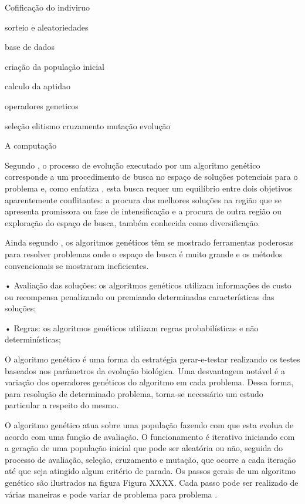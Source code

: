 


Cofificação do indiviruo 

sorteio e aleatoriedades

base de dados

criação da população inicial

calculo da aptidao

operadores geneticos

seleção 
elitismo 
cruzamento
mutação
evolução



A computação 





Segundo \cite{oliveira2005algoritmo}, o processo de evolução executado por um algoritmo genético corresponde a um procedimento de busca no espaço de soluções potenciais para o problema e, como enfatiza \cite{michalewicz1996evolutionary}, esta busca requer um equilíbrio entre dois objetivos aparentemente conflitantes: a procura das melhores soluções na região que se apresenta promissora ou fase de intensificação e a procura de outra região ou exploração do espaço de busca, também conhecida como diversificação.\par

Ainda segundo \cite{oliveira2005algoritmo}, os algoritmos genéticos têm se mostrado ferramentas poderosas para resolver problemas onde o espaço de busca é muito grande e os métodos convencionais se mostraram ineficientes.\par


•  Avaliação das soluções: os algoritmos genéticos utilizam informações de custo ou recompensa penalizando ou premiando determinadas características das soluções; \par

•  Regras: os algoritmos genéticos utilizam regras probabilísticas e não determinísticas; \par

O algoritmo genético é uma forma da estratégia gerar-e-testar realizando os testes baseados nos parâmetros da evolução biológica. Uma desvantagem notável é a variação dos operadores genéticos do algoritmo em cada problema. Dessa forma, para resolução de determinado problema, torna-se necessário um estudo particular a respeito do mesmo. \par

O algoritmo genético atua sobre uma população fazendo com que esta evolua de acordo com uma função de avaliação. O funcionamento é iterativo iniciando com a geração de uma população inicial que pode ser aleatória ou não, seguida do processo de avaliação, seleção, cruzamento e mutação, que ocorre a cada iteração até que seja atingido algum critério de parada. Os passos gerais de um algoritmo genético são ilustrados na figura 
Figura XXXX. Cada passo pode ser realizado de várias maneiras e pode variar de problema para problema \cite{timoteo2005desenvolvimento}.\par 

